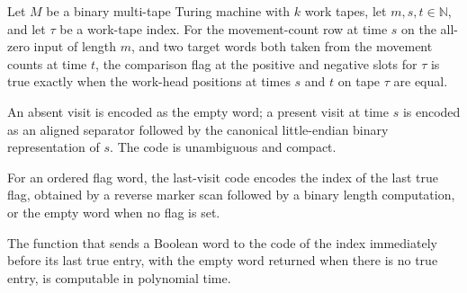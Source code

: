 \begin{lemma}
\label{Complexity.clMatchFlag_schedule}
\leanok
{}
Let $M$ be a binary multi-tape Turing machine with $k$ work tapes, let
$m,s,t\in\mathbb{N}$, and let $\tau$ be a work-tape index. For the movement-count row at
time $s$ on the all-zero input of length $m$, and two target words both taken from the
movement counts at time $t$, the comparison flag at the positive and negative slots for
$\tau$ is true exactly when the work-head positions at times $s$ and $t$ on tape $\tau$
are equal.
\end{lemma}

\begin{definition}
\label{Complexity.clVisitCode}
\leanok
{}
An absent visit is encoded as the empty word; a present visit at time $s$ is encoded as an aligned separator followed by the canonical little-endian binary representation of $s$. The code is unambiguous and compact.
\end{definition}

\begin{definition}
\label{Complexity.clLastCode}
\leanok
{}
For an ordered flag word, the last-visit code encodes the index of the last true flag, obtained by a reverse marker scan followed by a binary length computation, or the empty word when no flag is set.
\end{definition}

\begin{lemma}
\label{Complexity.clLastCode_native}
\leanok
{}
The function that sends a Boolean word to the code of the index immediately before its
last true entry, with the empty word returned when there is no true entry, is computable
in polynomial time.
\end{lemma}


